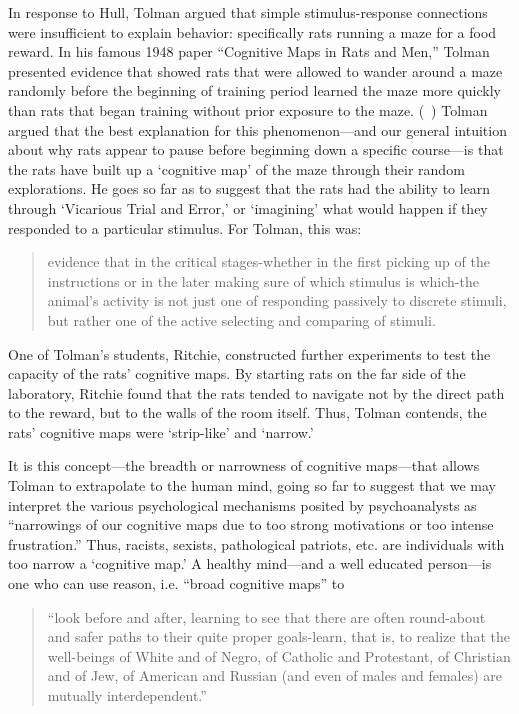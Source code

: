 \begin{refsection}
In response to Hull, Tolman argued that simple stimulus-response connections were insufficient to explain behavior: specifically rats running a maze for a food reward. In his famous 1948 paper ``Cognitive Maps in Rats and Men,'' Tolman presented evidence that showed rats that were allowed to wander around a maze randomly before the beginning of training period learned the maze more quickly than rats that began training without prior exposure to the maze. (~\citep{Tolman:1948kv}) Tolman argued that the best explanation for this phenomenon---and our general intuition about why rats appear to pause before beginning down a specific course---is that the rats have built up a `cognitive map' of the maze through their random explorations. He goes so far as to suggest that the rats had the ability to learn through `Vicarious Trial and Error,' or `imagining' what would happen if they responded to a particular stimulus. For Tolman, this was:

\begin{quote}

evidence that in the critical stages-whether in the first picking up of the instructions or in the later making sure of which stimulus is which-the animal's activity is not just one of responding passively to discrete stimuli, but rather one of the active selecting and comparing of stimuli. ~\citep[p. 200]{Tolman:1948kv}
\end{quote}

One of Tolman's students, Ritchie, constructed further experiments to test the capacity of the rats' cognitive maps. By starting rats on the far side of the laboratory, Ritchie found that the rats tended to navigate not by the direct path to the reward, but to the walls of the room itself. Thus, Tolman contends, the rats' cognitive maps were `strip-like' and `narrow.'

It is this concept---the breadth or narrowness of cognitive maps---that allows Tolman to extrapolate to the human mind, going so far to suggest that we may interpret the various psychological mechanisms posited by psychoanalysts as ``narrowings of our cognitive maps due to too strong motivations or too intense frustration.'' Thus, racists, sexists, pathological patriots, etc. are individuals with too narrow a `cognitive map.' A healthy mind---and a well educated person---is one who can use reason, i.e. ``broad cognitive maps'' to

\begin{quote}

``look before and after, learning to see that there are often round-about and safer paths to their quite proper goals-learn, that is, to realize that the well-beings of White and of Negro, of Catholic and Protestant, of Christian and of Jew, of American and Russian (and even of males and females) are mutually interdependent.'' ~\citep[p. 208]{Tolman:1948kv}
\end{quote}


\end{refsection}
